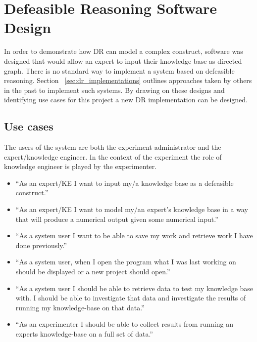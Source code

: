 
\section{Defeasible Reasoning Software Design}

In order to demonstrate how DR can model a complex construct, software was designed that would allow an expert to input their knowledge base as directed graph. There is no standard way to implement a system based on defeasible reasoning. Section ~\ref{sec:dr_implementations} outlines approaches taken by others in the past to implement such systems. By drawing on these designs and identifying use cases for this project a new DR implementation can be designed. 

\subsection{Use cases}

The users of the system are both the experiment administrator and the expert/knowledge engineer. In the context of the experiment the role of knowledge engineer is played by the experimenter.

\begin{itemize}
  \item ``As an expert/KE I want to input my/a knowledge base as a defeasible construct.''
  \item ``As an expert/KE I want to model my/an expert's knowledge base in a way that will produce a numerical output given some numerical input.''
  \item ``As a system user I want to be able to save my work and retrieve work I have done previously.''
  \item ``As a system user, when I open the program what I was last working on should be displayed or a new project should open.''
  \item ``As a system user I should be able to retrieve data to test my knowledge base with. I should be able to investigate that data and investigate the results of running my knowledge-base on that data.''
  \item ``As an experimenter I should be able to collect results from running an experts knowledge-base on a full set of data.''
\end{itemize}

